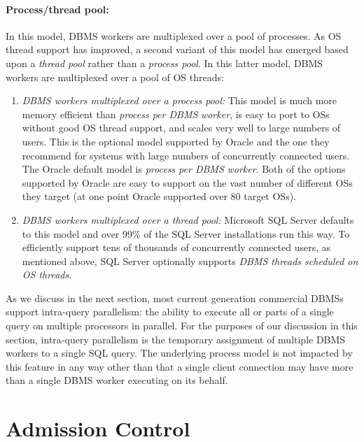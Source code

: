 \documentclass[a4paper,11pt,twoside,openright]{book}
\begin{document}
\paragraph{Process/thread pool:}

In this model, DBMS workers are multiplexed over a pool of processes. As
OS thread support has improved, a second variant of this model
has emerged based upon a \emph{thread pool} rather than a \emph{process
pool}. In this latter model, DBMS workers are multiplexed over a pool of
OS threads:

\begin{enumerate}
\def\labelenumi{\arabic{enumi}.}
\item
  \emph{DBMS workers multiplexed over a process pool:} This model is
  much more memory efficient than \emph{process per DBMS} \emph{worker},
  is easy to port to OSs without good OS thread support, and scales
  very well to large numbers of users. This is the optional model
  supported by Oracle and the one they recommend for systems with large
  numbers of concurrently connected users. The Oracle default model is
  \emph{process per DBMS} \emph{worker}. Both of the options supported
  by Oracle are easy to support on the vast number of different OSs they
  target (at one point Oracle supported over 80 target OSs).
\item
  \emph{DBMS workers multiplexed over a thread pool:} Microsoft SQL
  Server defaults to this model and over 99\% of the SQL Server
  installations run this way. To efficiently support tens of thousands
  of concurrently connected users, as mentioned above, SQL Server
  optionally supports \emph{DBMS threads scheduled on OS threads}.
\end{enumerate}

As we discuss in the next section, most current generation commercial
DBMSs support intra-query parallelism: the ability to execute all or
parts of a single query on multiple processors in parallel. For the
purposes of our discussion in this section, intra-query parallelism is
the temporary assignment of multiple DBMS workers to a single SQL query.
The underlying process model is not impacted by this feature in any way
other than that a single client connection may have more than a single
DBMS worker executing on its behalf.

\hypertarget{admission-control}{%
\section{Admission Control}\label{admission-control}}
\end{document}
